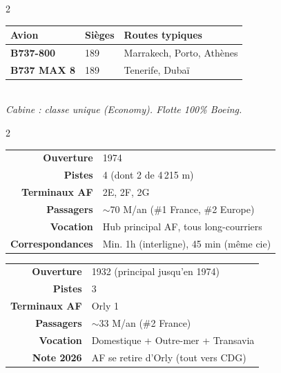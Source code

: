 \documentclass[9pt,a4paper,landscape]{article}
\newcommand{\sectionbanner}[2]{%
\noindent\colorbox{#1}{\parbox{\dimexpr\textwidth-2\fboxsep}{%
\vspace{3pt}\hspace{6pt}{\Large\bfseries\color{white}#2}\vspace{3pt}}}%
\vspace{4pt}%
}
\begin{document}
\begin{multicols}{2}
\begin{tcolorbox}[colback=amerlight,colframe=ameror,title={\textbf{TRANSAVIA (TO)}},fonttitle=\bfseries\color{white}]
\begin{tabular}{lll}
\toprule
\textbf{Avion} & \textbf{Sièges} & \textbf{Routes typiques} \\
\midrule
\textbf{B737-800} & 189 & Marrakech, Porto, Athènes \\
\textbf{B737 MAX 8} & 189 & Tenerife, Dubaï \\
\bottomrule
\end{tabular}\\[0.1cm]
\textit{Cabine : classe unique (Economy). Flotte 100\% Boeing.}
\end{tcolorbox}

\end{multicols}

\sectionbanner{afblue}{HUBS PARIS --- CDG \& ORLY}

\begin{multicols}{2}
\scriptsize

\begin{tcolorbox}[colback=aflight,colframe=afblue,title={\textbf{PARIS-CHARLES DE GAULLE (CDG / LFPG)}},fonttitle=\bfseries\color{white}]
\begin{tabular}{rl}
\textbf{Ouverture} & 1974 \\
\textbf{Pistes} & 4 (dont 2 de 4\,215 m) \\
\textbf{Terminaux AF} & 2E, 2F, 2G \\
\textbf{Passagers} & $\sim$70 M/an (\#1 France, \#2 Europe) \\
\textbf{Vocation} & Hub principal AF, tous long-courriers \\
\textbf{Correspondances} & Min. 1h (interligne), 45 min (même cie) \\
\end{tabular}
\end{tcolorbox}

\begin{tcolorbox}[colback=aflight,colframe=afred,title={\textbf{PARIS-ORLY (ORY / LFPO)}},fonttitle=\bfseries\color{white}]
\begin{tabular}{rl}
\textbf{Ouverture} & 1932 (principal jusqu'en 1974) \\
\textbf{Pistes} & 3 \\
\textbf{Terminaux AF} & Orly 1 \\
\textbf{Passagers} & $\sim$33 M/an (\#2 France) \\
\textbf{Vocation} & Domestique + Outre-mer + Transavia \\
\textbf{Note 2026} & AF se retire d'Orly (tout vers CDG) \\
\end{tabular}
\end{tcolorbox}

\end{multicols}
\end{document}
